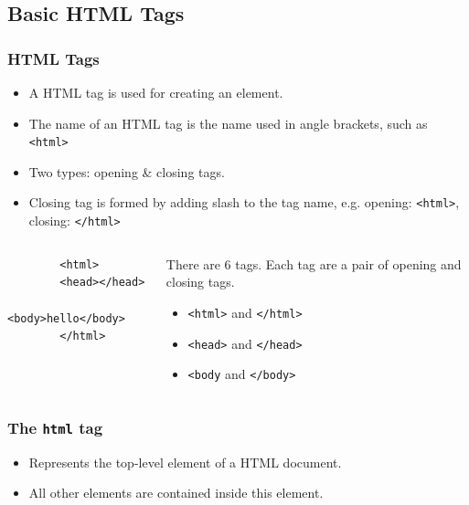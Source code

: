 \documentclass[12pt]{beamer}
\begin{document}
\subsection{Basic HTML Tags}

\begin{frame}[fragile]
\frametitle{HTML Tags}
\begin{itemize}
	\item A HTML tag is used for creating an element.
	\item The name of an HTML tag is the name used in angle brackets, such as \texttt{<html>}\footnotemark
	\item Two types: opening \& closing tags.
	\item Closing tag is formed by adding slash to the tag name, e.g. opening: \texttt{<html>}, closing: \texttt{</html>}
\end{itemize}
\begin{columns}
	\begin{column}{0.3\linewidth}
		\begin{verbatim}
		<html>
		<head></head>
		<body>hello</body>
		</html>
		\end{verbatim}
	\end{column}
	\begin{column}{0.5\linewidth}
		There are 6 tags. Each tag are a pair of opening and closing tags.
		\begin{itemize}
			\item \texttt{<html>} and \texttt{</html>}
			\item \texttt{<head>} and \texttt{</head>}
			\item \texttt{<body} and \texttt{</body>}
		\end{itemize}
	\end{column}
\end{columns}
\end{frame}

\begin{frame}
\frametitle{The \texttt{html} tag}
\begin{itemize}
	\item Represents the top-level element of a HTML document.\footnotemark
	\item All other elements are contained inside this element.
\end{itemize}
\end{frame}
\end{document}
